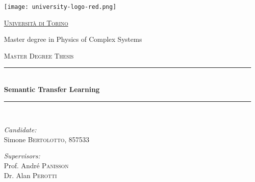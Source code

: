 \begin{titlepage}
\begin{center}


\texttt{[image: university-logo-red.png]}

\vspace{0.3cm}

{\scshape \LARGE \href{https://www.unito.it}{Università di Torino}\\}

\vspace{0.5cm}

{\large Master degree in Physics of Complex Systems}

\vspace{1.3cm}

{\scshape \Large Master Degree Thesis\\}

\vspace{1.3cm}

\rule{.9\linewidth}{.6pt} \\ [0.4cm]
{\huge \bfseries Semantic Transfer Learning\\} \vspace{0.4cm}
\rule{.9\linewidth}{.6pt} \\ [1.5cm]

\begin{minipage}[t]{0.4\textwidth}
\begin{flushleft} \large
  \emph{Candidate:}\\ \vspace{0.1cm}
  {Simone {\scshape Bertolotto}, 857533}
\end{flushleft}
\end{minipage}
\begin{minipage}[t]{0.4\textwidth}
  \begin{flushright} \large
    \emph{Supervisors:}\\ \vspace{0.1cm}
    {Prof. André {\scshape Panisson}} \\
    {Dr. Alan {\scshape Perotti}}
  \end{flushright}
\end{minipage}\\[3cm]


\end{center}
\end{titlepage}
